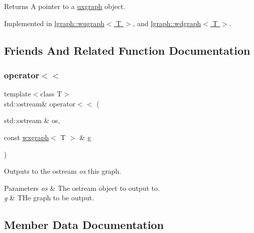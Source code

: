\begin{DoxyReturn}{Returns}
A pointer to a \hyperlink{classlgraph_1_1uxgraph}{uxgraph} object. 
\end{DoxyReturn}


Implemented in \hyperlink{classlgraph_1_1wugraph_af5a08c0b6bc0393abbae31c16a364f62}{lgraph\+::wugraph$<$ T $>$}, and \hyperlink{classlgraph_1_1wdgraph_ac4af8d76693facea90dc27d10e93c8f0}{lgraph\+::wdgraph$<$ T $>$}.



\subsection{Friends And Related Function Documentation}
\mbox{\label{classlgraph_1_1wxgraph_a0ba89d65c4392a4f68c8e8138d5dcc66}} 
\subsubsection{\texorpdfstring{operator$<$$<$}{operator<<}}
{\footnotesize\ttfamily template$<$class T$>$ \\
std\+::ostream\& operator$<$$<$ (\begin{DoxyParamCaption}\item[{std\+::ostream \&}]{os,  }\item[{const \hyperlink{classlgraph_1_1wxgraph}{wxgraph}$<$ T $>$ \&}]{g }\end{DoxyParamCaption})\hspace{0.3cm}{\ttfamily [friend]}}



Outputs to the ostream {\itshape os} this graph. 


\begin{DoxyParams}{Parameters}
{\em os} & The ostream object to output to. \\
\hline
{\em g} & T\+He graph to be output. \\
\hline
\end{DoxyParams}


\subsection{Member Data Documentation}
\mbox{\label{classlgraph_1_1wxgraph_a6f8c983edc82913c2d78b7bc871defe8}} 
